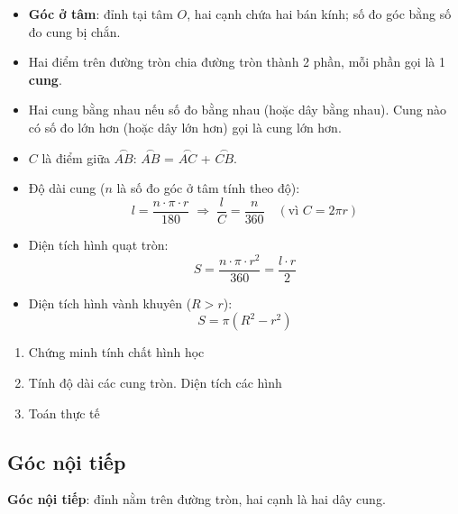 \documentclass[12pt,a4paper]{article}
\begin{document}
\begin{dinhnghia}[title={Góc ở tâm và cung tròn}]
  \begin{itemize}
    \item \textbf{Góc ở tâm}: đỉnh tại tâm $O$, hai cạnh chứa hai bán kính; số đo góc bằng số đo cung bị chắn.
    \item Hai điểm trên đường tròn chia đường tròn thành 2 phần, mỗi phần gọi là 1 \textbf{cung}.
    \item Hai cung bằng nhau nếu số đo bằng nhau (hoặc dây bằng nhau). Cung nào có số đo lớn hơn (hoặc dây lớn hơn) gọi là cung lớn hơn.
    \item $C$ là điểm giữa $\overset{\frown}{AB}$: $\overset{\frown}{AB}$ = $\overset{\frown}{AC}$ + $\overset{\frown}{CB}$.
  \end{itemize}
\end{dinhnghia}

\begin{congthuc}
  \begin{itemize}
    \item Độ dài cung ($n$ là số đo góc ở tâm tính theo độ):
    \[l = \frac{n \cdot \pi \cdot r}{180} \;\Rightarrow\; \frac{l}{C} = \frac{n}{360} \quad (\text{vì } C = 2\pi r)\]
    \item Diện tích hình quạt tròn:
    \[S = \frac{n \cdot \pi \cdot r^2}{360} = \frac{l \cdot r}{2}\]
    \item Diện tích hình vành khuyên ($R > r$):
    \[S = \pi(R^2 - r^2)\]
  \end{itemize}
\end{congthuc}

\begin{enumerate}[label=\textbf{Dạng \arabic*:}, leftmargin=*, align=left]
  \item Chứng minh tính chất hình học
  \item Tính độ dài các cung tròn. Diện tích các hình
  \item Toán thực tế
\end{enumerate}

\subsection{Góc nội tiếp}

\begin{dinhnghia}
  \textbf{Góc nội tiếp}: đỉnh nằm trên đường tròn, hai cạnh là hai dây cung.
\end{dinhnghia}
\end{document}
